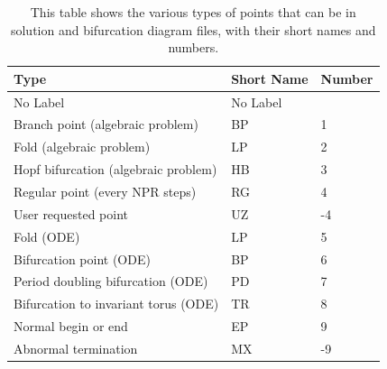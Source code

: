 \documentclass[12pt]{report}
\begin{document}
 \begin{table}[htbp]
 \begin{center}
 \begin{tabular}{| l | l | l |}
 \hline
 Type & Short Name & Number \\
 \hline
 No Label & No Label &  \\
 \hline
 Branch point (algebraic problem) & BP & 1 \\
 \hline
 Fold (algebraic problem) & LP & 2 \\
 \hline
 Hopf bifurcation (algebraic problem) & HB & 3 \\
 \hline
 Regular point (every NPR steps) & RG & 4 \\
 \hline
 User requested point & UZ & -4 \\
 \hline
 Fold (ODE) & LP & 5 \\
 \hline
 Bifurcation point (ODE) & BP & 6 \\
 \hline
 Period doubling bifurcation (ODE) & PD & 7 \\
 \hline
 Bifurcation to invariant torus (ODE) & TR & 8 \\
 \hline
 Normal begin or end & EP & 9 \\
 \hline
 Abnormal termination & MX & -9 \\
 \hline
 \end{tabular}
 \caption[Type translations.]
 {This table shows the various types of points
 that can be in solution and bifurcation diagram
 files, with their short names and numbers.}
 \label{tbl:clui type translation}
 \end{center}
 \end{table}
\end{document}
